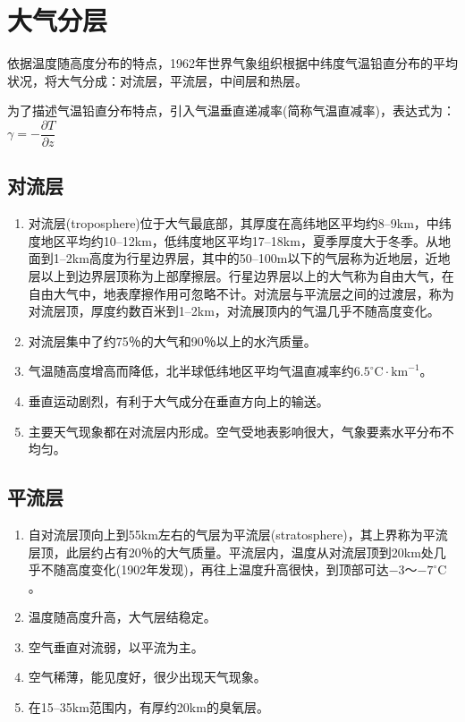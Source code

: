 \documentclass[UTF8,a4paper,11pt,oneside]{ctexbook}
\begin{document}
\section{大气分层}

依据温度随高度分布的特点，1962年世界气象组织根据中纬度气温铅直分布的平均状况，将大气分成：对流层，平流层，中间层和热层。

为了描述气温铅直分布特点，引入气温垂直递减率(简称气温直减率)，表达式为：\(\gamma=-\dfrac{\partial{}T}{\partial{}z}\)
\subsection{对流层}
\begin{enumerate}
    \item 对流层(troposphere)位于大气最底部，其厚度在高纬地区平均约8--9km，中纬度地区平均约10--12km，低纬度地区平均17--18km，夏季厚度大于冬季。从地面到1--2km高度为行星边界层，其中的50--100m以下的气层称为近地层，近地层以上到边界层顶称为上部摩擦层。行星边界层以上的大气称为自由大气，在自由大气中，地表摩擦作用可忽略不计。对流层与平流层之间的过渡层，称为对流层顶，厚度约数百米到1--2km，对流展顶内的气温几乎不随高度变化。
    \item 对流层集中了约75％的大气和90％以上的水汽质量。
    \item 气温随高度增高而降低，北半球低纬地区平均气温直减率约\(6.5^\circ\mathrm{C\cdot{}km}^{-1}\)。
    \item 垂直运动剧烈，有利于大气成分在垂直方向上的输送。
    \item 主要天气现象都在对流层内形成。空气受地表影响很大，气象要素水平分布不均匀。
\end{enumerate}

\subsection{平流层}
\begin{enumerate}
    \item 自对流层顶向上到55km左右的气层为平流层(stratosphere)，其上界称为平流层顶，此层约占有20％的大气质量。平流层内，温度从对流层顶到20km处几乎不随高度变化(1902年发现)，再往上温度升高很快，到顶部可达\(-3\)～\(-7^\circ\mathrm{C}\)。
    \item 温度随高度升高，大气层结稳定。
    \item 空气垂直对流弱，以平流为主。
    \item 空气稀薄，能见度好，很少出现天气现象。
    \item 在15--35km范围内，有厚约20km的臭氧层。
\end{enumerate}
\end{document}
